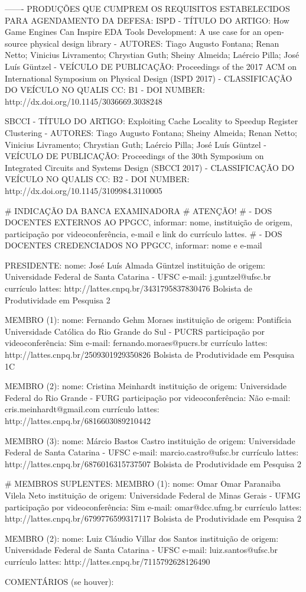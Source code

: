 -------
PRODUÇÕES QUE CUMPREM OS REQUISITOS ESTABELECIDOS PARA AGENDAMENTO DA DEFESA:
ISPD
- TÍTULO DO ARTIGO: How Game Engines Can Inspire EDA Tools Development: A use case for an open-source physical design library
- AUTORES: Tiago Augusto Fontana; Renan Netto; Vinicius Livramento; Chrystian Guth; Sheiny Almeida; Laércio Pilla; José Luís Güntzel
- VEÍCULO DE PUBLICAÇÃO: Proceedings of the 2017 ACM on International Symposium on Physical Design (ISPD 2017)
- CLASSIFICAÇÃO DO VEÍCULO NO QUALIS CC: B1
- DOI NUMBER: http://dx.doi.org/10.1145/3036669.3038248

SBCCI
- TÍTULO DO ARTIGO: Exploiting Cache Locality to Speedup Register Clustering
- AUTORES: Tiago Augusto Fontana; Sheiny Almeida; Renan Netto; Vinicius Livramento; Chrystian Guth;  Laércio Pilla; José Luís Güntzel
- VEÍCULO DE PUBLICAÇÃO: Proceedings of the 30th Symposium on Integrated Circuits and Systems Design (SBCCI 2017)
- CLASSIFICAÇÃO DO VEÍCULO NO QUALIS CC: B2
- DOI NUMBER: http://dx.doi.org/10.1145/3109984.3110005


# INDICAÇÃO DA BANCA EXAMINADORA
# ATENÇÃO!
# - DOS DOCENTES EXTERNOS AO PPGCC, informar: nome, instituição de origem, participação por videoconferência, e-mail e link do currículo lattes.
# - DOS DOCENTES CREDENCIADOS NO PPGCC, informar: nome e e-mail

PRESIDENTE: 
nome: José Luís Almada Güntzel
instituição de origem: Universidade Federal de Santa Catarina - UFSC
e-mail: j.guntzel@ufsc.br
currículo lattes: http://lattes.cnpq.br/3431795837830476
Bolsista de Produtividade em Pesquisa 2

MEMBRO (1):
nome: Fernando Gehm Moraes
instituição de origem: Pontifícia Universidade Católica do Rio Grande do Sul - PUCRS
participação por videoconferência: Sim
e-mail: fernando.moraes@pucrs.br
currículo lattes: http://lattes.cnpq.br/2509301929350826
Bolsista de Produtividade em Pesquisa 1C 

MEMBRO (2):
nome: Cristina Meinhardt
instituição de origem: Universidade Federal do Rio Grande - FURG
participação por videoconferência: Não
e-mail: cris.meinhardt@gmail.com
currículo lattes: http://lattes.cnpq.br/6816603089210442

MEMBRO (3):
nome: Márcio Bastos Castro
instituição de origem: Universidade Federal de Santa Catarina - UFSC
e-mail: marcio.castro@ufsc.br
currículo lattes: http://lattes.cnpq.br/6876016315737507
Bolsista de Produtividade em Pesquisa 2

# MEMBROS SUPLENTES:
MEMBRO (1):
nome: Omar Omar Paranaiba Vilela Neto
instituição de origem: Universidade Federal de Minas Gerais - UFMG
participação por videoconferência: Sim
e-mail: omar@dcc.ufmg.br
currículo lattes: http://lattes.cnpq.br/6799776599317117
Bolsista de Produtividade em Pesquisa 2

MEMBRO (2):
nome: Luiz Cláudio Villar dos Santos
instituição de origem: Universidade Federal de Santa Catarina - UFSC
e-mail: luiz.santos@ufsc.br 
currículo lattes: http://lattes.cnpq.br/7115792628126490


COMENTÁRIOS (se houver):

